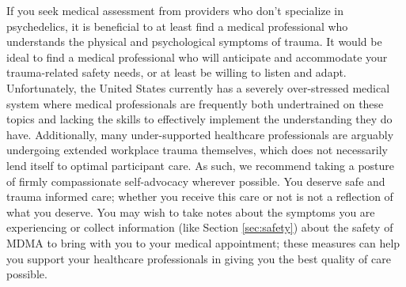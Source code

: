 \documentclass[12pt,letterpaper]{book}
\begin{document}
If you seek medical assessment from providers who don't specialize in psychedelics, it is beneficial to at least find a medical professional who understands the physical and psychological symptoms of trauma. It would be ideal to find a medical professional who will anticipate and accommodate your trauma-related safety needs, or at least be willing to listen and adapt. Unfortunately, the United States currently has a severely over-stressed medical system where medical professionals are frequently both undertrained on these topics and lacking the skills to effectively implement the understanding they do have. Additionally, many under-supported healthcare professionals are arguably undergoing extended workplace trauma themselves, which does not necessarily lend itself to optimal participant care. As such, we recommend taking a posture of firmly compassionate self-advocacy wherever possible. You deserve safe and trauma informed care; whether you receive this care or not is not a reflection of what you deserve. You may wish to take notes about the symptoms you are experiencing or collect information (like Section \ref{sec:safety}) about the safety of MDMA to bring with you to your medical appointment; these measures can help you support your healthcare professionals in giving you the best quality of care possible.
\end{document}
